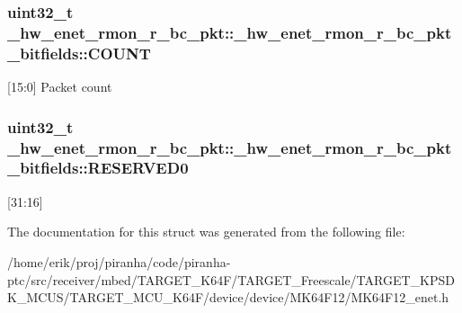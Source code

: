 \subsubsection[{\texorpdfstring{C\+O\+U\+NT}{COUNT}}]{\setlength{\rightskip}{0pt plus 5cm}uint32\+\_\+t \+\_\+hw\+\_\+enet\+\_\+rmon\+\_\+r\+\_\+bc\+\_\+pkt\+::\+\_\+hw\+\_\+enet\+\_\+rmon\+\_\+r\+\_\+bc\+\_\+pkt\+\_\+bitfields\+::\+C\+O\+U\+NT}\hypertarget{struct__hw__enet__rmon__r__bc__pkt_1_1__hw__enet__rmon__r__bc__pkt__bitfields_a2761861dcf1a2735f587283ca8e44250}{}\label{struct__hw__enet__rmon__r__bc__pkt_1_1__hw__enet__rmon__r__bc__pkt__bitfields_a2761861dcf1a2735f587283ca8e44250}
\mbox{[}15\+:0\mbox{]} Packet count 
\subsubsection[{\texorpdfstring{R\+E\+S\+E\+R\+V\+E\+D0}{RESERVED0}}]{\setlength{\rightskip}{0pt plus 5cm}uint32\+\_\+t \+\_\+hw\+\_\+enet\+\_\+rmon\+\_\+r\+\_\+bc\+\_\+pkt\+::\+\_\+hw\+\_\+enet\+\_\+rmon\+\_\+r\+\_\+bc\+\_\+pkt\+\_\+bitfields\+::\+R\+E\+S\+E\+R\+V\+E\+D0}\hypertarget{struct__hw__enet__rmon__r__bc__pkt_1_1__hw__enet__rmon__r__bc__pkt__bitfields_a7326caad136decaa115638aa87116183}{}\label{struct__hw__enet__rmon__r__bc__pkt_1_1__hw__enet__rmon__r__bc__pkt__bitfields_a7326caad136decaa115638aa87116183}
\mbox{[}31\+:16\mbox{]} 

The documentation for this struct was generated from the following file\+:\begin{DoxyCompactItemize}
\item 
/home/erik/proj/piranha/code/piranha-\/ptc/src/receiver/mbed/\+T\+A\+R\+G\+E\+T\+\_\+\+K64\+F/\+T\+A\+R\+G\+E\+T\+\_\+\+Freescale/\+T\+A\+R\+G\+E\+T\+\_\+\+K\+P\+S\+D\+K\+\_\+\+M\+C\+U\+S/\+T\+A\+R\+G\+E\+T\+\_\+\+M\+C\+U\+\_\+\+K64\+F/device/device/\+M\+K64\+F12/M\+K64\+F12\+\_\+enet.\+h\end{DoxyCompactItemize}
